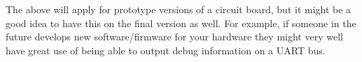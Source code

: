The above will apply for prototype versions of a circuit board, but it might be a good idea to have this on the final version as well. For example, if someone in the future develops new software/firmware for your hardware they might very well have great use of being able to output debug information on a UART bus.


